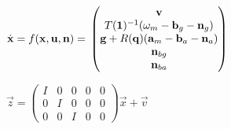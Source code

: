 $\dot{\vec{x}} = f(\vec{x}, \vec{u}, \vec{n}) = \\
 \begin{pmatrix}
   \vec{v}\\
   T(\vec{1})^{-1} ( \vec{\omega}_m - \vec{b}_g - \vec{n}_g)\\
   \vec{g} + R(\vec{q})(\vec{a}_m - \vec{b}_a - \vec{n}_a)\\
   \vec{n}_{bg} \\
   \vec{n}_{ba}
 \end{pmatrix}$

$\vec{z} = \begin{pmatrix}
I & 0 & 0 & 0 & 0\\
0 & I & 0 & 0 & 0\\
0 & 0 & I & 0 & 0
\end{pmatrix} \vec{x} +
\vec{v}$
